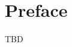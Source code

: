 \documentclass[../main.tex]{subfiles}
\begin{document}
\chapter{Preface}
\maketitle
TBD
\begin{thebibliography}{99}

\end{thebibliography}
\end{document}
